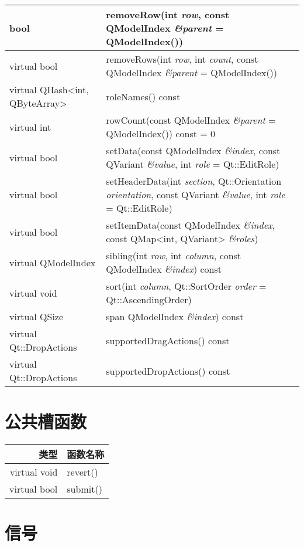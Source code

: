 \begin{longtable}[l]{|m{10em}|m{30em}|}
\hline
bool&	removeRow(int \emph{row}, const QModelIndex \emph{\&parent} = QModelIndex())\\
\hline
virtual bool&	removeRows(int \emph{row}, int \emph{count}, const QModelIndex \emph{\&parent} = QModelIndex())\\
\hline
virtual QHash<int, QByteArray>&	roleNames() const\\
\hline
virtual int	& rowCount(const QModelIndex \emph{\&parent} = QModelIndex()) const = 0\\
\hline
virtual bool &setData(const QModelIndex \emph{\&index}, const QVariant \emph{\&value}, int \emph{role} = Qt::EditRole)\\
\hline
virtual bool	&setHeaderData(int \emph{section}, Qt::Orientation \emph{orientation}, const QVariant \emph{\&value}, int \emph{role} = Qt::EditRole)\\
\hline
virtual bool	&setItemData(const QModelIndex \emph{\&index}, const QMap<int, QVariant> \emph{\&roles})\\
\hline
virtual QModelIndex&	sibling(int \emph{row}, int \emph{column}, const QModelIndex \emph{\&index}) const\\
\hline
virtual void	&sort(int \emph{column}, Qt::SortOrder \emph{order} = Qt::AscendingOrder)\\
\hline
virtual QSize	&span QModelIndex \emph{\&index}) const\\
\hline
virtual Qt::DropActions	&supportedDragActions() const\\
\hline
virtual Qt::DropActions	&supportedDropActions() const\\
\hline
\end{longtable}

\splitLine

\section{公共槽函数}

\begin{tabular}{|r|l|}
\hline
类型 & 函数名称 \\
\hline
virtual void	&revert()\\
\hline
virtual bool	&submit()\\
\hline
\end{tabular}

\splitLine

\section{信号}

